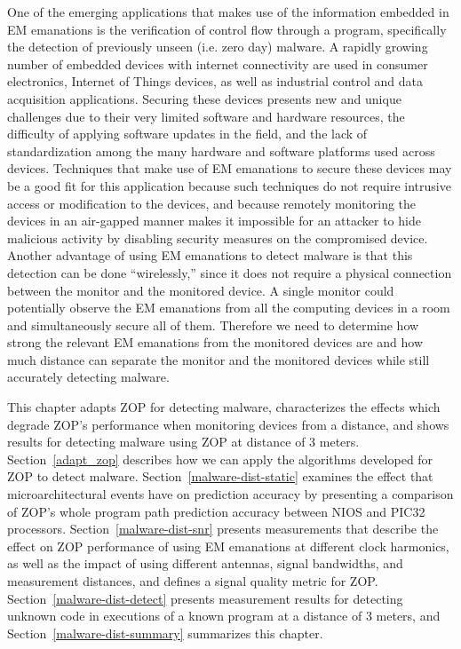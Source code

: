 One of the emerging applications that makes use of the information embedded in EM emanations is the verification of control flow through a program, specifically the detection of previously unseen (i.e. zero day) malware. A rapidly growing number of embedded devices with internet connectivity are used in consumer electronics, Internet of Things devices, as well as industrial control and data acquisition applications. Securing these devices presents new and unique challenges due to their very limited software and hardware resources, the difficulty of applying software updates in the field, and the lack of standardization among the many hardware and software platforms used across devices. Techniques that make use of EM emanations to secure these devices may be a good fit for this application because such techniques do not require intrusive access or modification to the devices, and because remotely monitoring the devices in an air-gapped manner makes it impossible for an attacker to hide malicious activity by disabling security measures on the compromised device. Another advantage of using EM emanations to detect malware is that this detection can be done ``wirelessly,'' since it does not require a physical connection between the monitor and the monitored device. A single monitor could potentially observe the EM emanations from all the computing devices in a room and simultaneously secure all of them. Therefore we need to determine how strong the relevant EM emanations from the monitored devices are and how much distance can separate the monitor and the monitored devices while still accurately detecting malware. 

This chapter adapts ZOP for detecting malware, characterizes the effects which degrade ZOP's performance when monitoring devices from a distance, and shows results for detecting malware using ZOP at distance of 3 meters. Section~\ref{adapt_zop} describes how we can apply the algorithms developed for ZOP to detect malware. Section~\ref{malware-dist-static} examines the effect that microarchitectural events have on prediction accuracy by presenting a comparison of ZOP's whole program path prediction accuracy between NIOS and PIC32 processors. Section~\ref{malware-dist-snr} presents measurements that describe the effect on ZOP performance of using EM emanations at different clock harmonics, as well as the impact of using different antennas, signal bandwidths, and measurement distances, and defines a signal quality metric for ZOP. Section~\ref{malware-dist-detect} presents measurement results for detecting unknown code in executions of a known program at a distance of 3 meters, and Section~\ref{malware-dist-summary} summarizes this chapter. 


